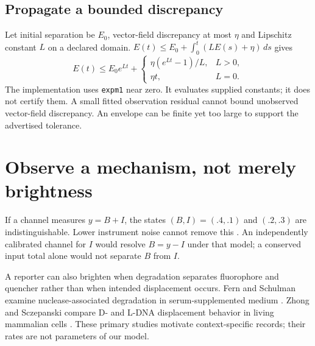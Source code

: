 \subsection{Propagate a bounded discrepancy}
Let initial separation be $E_0$, vector-field discrepancy at most $\eta$ and
Lipschitz constant $L$ on a declared domain.
$E(t)\le E_0+\int_0^t(LE(s)+\eta)\,ds$ gives
\[
 E(t)\le E_0e^{Lt}+
 \begin{cases}\eta(e^{Lt}-1)/L,&L>0,\\\eta t,&L=0.\end{cases}
\]
The implementation uses \texttt{expm1} near zero. It evaluates supplied constants;
it does not certify them. A small fitted observation residual cannot bound
unobserved vector-field discrepancy. An envelope can be finite yet too large to
support the advertised tolerance.

\section{Observe a mechanism, not merely brightness}
If a channel measures $y=B+I$, the states $(B,I)=(.4,.1)$ and $(.2,.3)$ are
indistinguishable. Lower instrument noise cannot remove this
. An independently calibrated channel for
$I$ would resolve $B=y-I$ under that model; a conserved input total alone would
not separate $B$ from $I$.

A reporter can also brighten when degradation separates fluorophore and
quencher rather than when intended displacement occurs.
Fern and Schulman examine nuclease-associated degradation in serum-supplemented
medium \cite{FernSchulman2017}. Zhong and Sczepanski compare D- and L-DNA displacement
behavior in living mammalian cells \cite{ZhongSczepanski2021}. These primary studies
motivate context-specific records; their rates are not parameters of our model.

